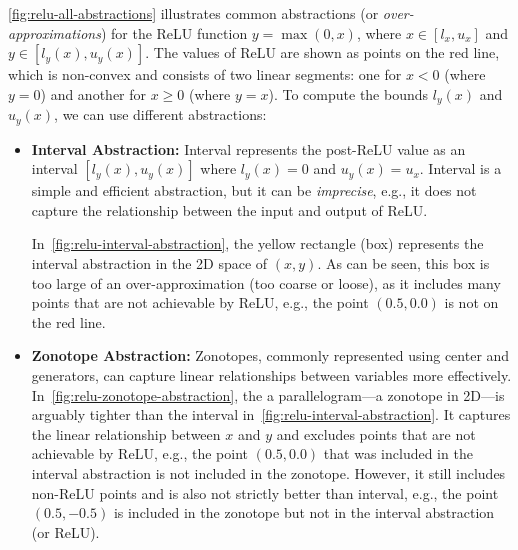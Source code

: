 \documentclass[oneside,11pt,dvipsnames]{book}
\numberwithin{equation}{section}
\theoremstyle{definition}
\theoremstyle{remark}
\begin{document}
\autoref{fig:relu-all-abstractions} illustrates common abstractions (or \emph{over-approximations}) for the ReLU function $y = \max(0, x)$, where $x \in [l_x, u_x]$ and $y \in [l_y(x), u_y(x)]$. The values of ReLU are shown as points on the \colorbox{myred}{red line}, which is non-convex and consists of two linear segments: one for $x < 0$ (where $y = 0$) and another for $x \geq 0$ (where $y = x$).
To compute the bounds $l_y(x)$ and $u_y(x)$, we can use different abstractions:

\begin{itemize}
    \item \textbf{Interval Abstraction:} Interval represents the post-ReLU value as an interval $[l_y(x), u_y(x)]$ where $l_y(x) = 0$ and $u_y(x) = u_x$. Interval is a simple and efficient abstraction, but it can be \emph{imprecise}, e.g., it does not capture the relationship between the input and output of ReLU. %

    In~\autoref{fig:relu-interval-abstraction}, the \colorbox{yellowfill}{yellow rectangle} (box) represents the interval abstraction in the 2D space of $(x, y)$. As can be seen, this box is too large of an over-approximation (too coarse or loose), as it includes many points that are not achievable by ReLU, e.g., the point $(0.5, 0.0)$ is not on the red line.

    \item \textbf{Zonotope Abstraction:} Zonotopes, commonly represented using center and generators, can capture linear relationships between variables more effectively. %
    In~\autoref{fig:relu-zonotope-abstraction}, the \colorbox{yellowfill}{a parallelogram}---a zonotope in 2D---is arguably tighter than the interval in~\autoref{fig:relu-interval-abstraction}.  It captures the linear relationship between $x$ and $y$ and excludes points that are not achievable by ReLU, e.g., the point $(0.5, 0.0)$ that was included in the interval abstraction is not included in the zonotope. However, it still includes non-ReLU points and is also not strictly better than interval, e.g., the point $(0.5, -0.5)$ is included in the zonotope but not in the interval abstraction (or ReLU).


\end{itemize}
\end{document}
